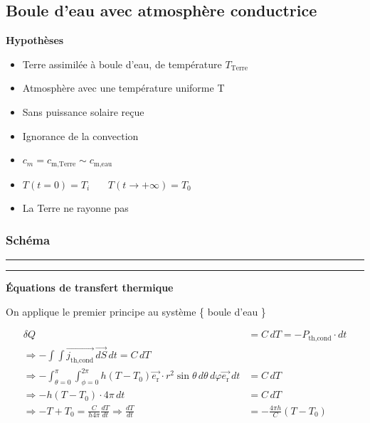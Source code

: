 \documentclass[a4paper,12pt]{article}
\begin{document}
\subsection{Boule d’eau avec atmosphère conductrice }
\textbf{Hypothèses}
\begin{itemize}
    \item Terre assimilée à boule d'eau, de température \(T_{\text{Terre}}\) 
    \item  Atmosphère avec une température uniforme T 
    \item  Sans puissance solaire reçue  
    \item  Ignorance de la convection  
    \item \(c_m=c_{\text{m,Terre}}\sim c_{\text{m,eau}}\) 
    \item $T(t=0) = T_i$ \ \ \
$T(t \to +\infty) = T_0$
    \item La Terre ne rayonne pas
   
\end{itemize}
\vspace{0.5cm}
\subsubsection*{Schéma} 
\noindent\textcolor{gray}{\rule{\linewidth}{0.4pt}}

    
\begin{center}
  
\end{center}
\noindent\textcolor{gray}{\rule{\linewidth}{0.4pt}}


\textbf{Équations de transfert thermique}

On applique le premier principe au système \{ boule d'eau  \}

\begin{align*}
\delta Q &= C\, dT = -P_{\text{th,cond}} \cdot dt \\
\Rightarrow -\int \int \vec{j_{\text{th,cond}}}\, \vec{dS}\,dt = C\, dT \\
\Rightarrow -\int_{\theta=0}^\pi \int_{\phi=0}^{2\pi} h(T - T_0) \vec{e_{\text{r}}}\cdot r^2 \sin\theta\, d\theta\, d\varphi \vec{e_{\text{r}}}\, dt &=  C\, dT  \\
\Rightarrow -h(T - T_0) \cdot 4\pi\, dt &= C\, dT \\
\Rightarrow -T + T_0 = \frac{C}{h 4\pi} \frac{dT}{dt} \Rightarrow \frac{dT}{dt} &= -\frac{4\pi h}{C}(T - T_0)
\end{align*}
\end{document}
